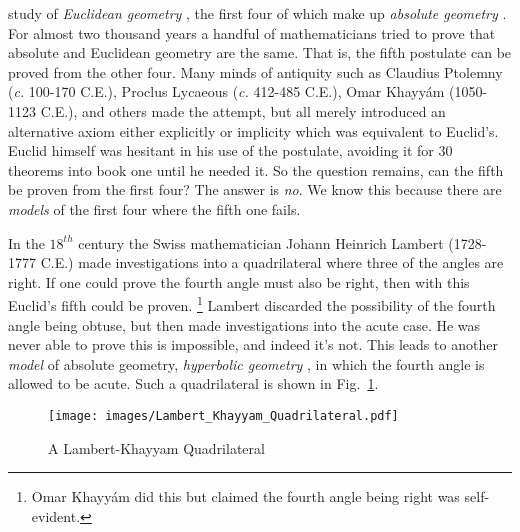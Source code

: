         study of \textit{Euclidean geometry}%
        , the first four of which make up
        \textit{absolute geometry}%
        . For almost two thousand years a handful of
        mathematicians tried to prove that absolute and Euclidean geometry are
        the same. That is, the fifth postulate can be proved from
        the other four. Many minds of antiquity such as Claudius Ptolemny%
         (\textit{c.} 100-170 C.E.), Proclus
        Lycaeous (\textit{c.} 412-485 C.E.), Omar
        Khayy\'{a}m (1050-1123 C.E.), and others
        made the attempt, but all merely introduced an alternative axiom either
        explicitly or implicity which was equivalent to Euclid's. Euclid himself
        was hesitant in his use of the postulate, avoiding it for 30 theorems
        into book one until he needed it. So the question remains, can the fifth
        be proven from the first four? The answer is \textit{no}. We know this
        because there are \textit{models} of the first four where
        the fifth one fails.
        \par\hfill\par
        In the $18^{th}$ century the Swiss mathematician Johann Heinrich
        Lambert (1728-1777 C.E.) made
        investigations into a quadrilateral where three of the angles are right.
        If one could prove the fourth angle must also be right, then with this
        Euclid's fifth could be proven.%
        \footnote{%
            Omar Khayy\'{a}m did this but claimed the fourth angle
            being right was self-evident.
        }
        Lambert discarded the possibility of the fourth angle being obtuse, but
        then made investigations into the acute case. He was never able to prove
        this is impossible, and indeed it's not. This leads to another
        \textit{model} of absolute geometry, \textit{hyperbolic geometry}%
        , in which the fourth angle is allowed to be
        acute. Such a quadrilateral is shown in
        Fig.~\ref{fig:Lambert_Khayyam_Quadrilateral}.
        \begin{figure}[H]
            \centering
            \captionsetup{type=figure}
            \if{}
                \texttt{[image: images/Lambert\_Khayyam\_Quadrilateral.pdf]}
            \fi
            \caption{A Lambert-Khayyam Quadrilateral}
            \label{fig:Lambert_Khayyam_Quadrilateral}
        \end{figure}
